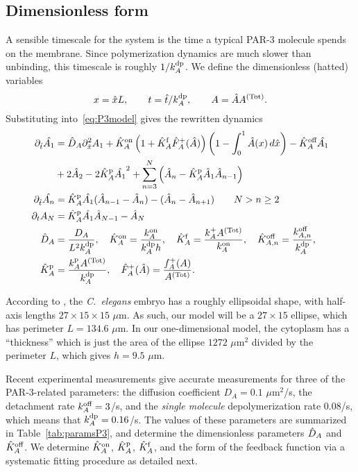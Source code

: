 \documentclass[11pt]{article}
\newcommand{\6}[1]{#1_{\text{6}}}
\newcommand{\3}[1]{#1_{\text{3}}}
\newcommand{\Tot}[1]{#1^\text{(Tot)}}
\newcommand{\A}[1]{#1_A}
\begin{document}
\subsection{Dimensionless form}
A sensible timescale for the system is the time a typical PAR-3 molecule spends on the membrane. Since polymerization dynamics are much slower than unbinding, this timescale is roughly $1/\A{\kdp}$. We define the dimensionless (hatted) variables $$x = \hat{x} L,\qquad t= \hat{t}/\A{\kdp},\qquad A= \hat{A}\Tot{A}.$$
Substituting into\ \eqref{eq:P3model} gives the rewritten dynamics
\begin{subequations}
\label{eq:PAR3gen}
\begin{align}
\nonumber
\Dthat \hat{\MA} & = \DhatA \Dxhat^2 \MA +\KhatonA \left(1+\KhatfA \hat F_A^+(\hat A) \right)\left(1 - \int_0^1 \hat A(x) \, d\hat{x} \right)- \KhatoffA \hat{\MA} \\ 
\label{eq:Amono} &+ 2 \hat{A}_2-2\KhatpA \hat{\MA}^2+\sum_{n=3}^N \left(\hat A_n-\KhatpA \hat A_1 \hat A_{n-1}\right)  \\
\label{eq:Apoly}
\Dthat \hat{\PA} & =\KhatpA \hat{\MA} (\hat A_{n-1}-\hat A_n) - (\hat A_n-\hat A_{n+1})  \qquad N > n \geq 2 \\ 
\Dt A_N & =\KhatpA\hat \MA \hat A_{N-1}- \hat A_N \\ 
\label{eq:paramsND}
\DhatA &=\frac{\A{D}}{L^2 \A{\kdp}}, \quad \KhatonA=\frac{\A{\kon}}{\A{\kdp} h }, \quad \KhatfA = \frac{\A{\kf}\Tot{A}}{\A{\kon}}, \quad  \Khatoff_{A,n} = \frac{\koff_{A,n}}{\A{\kdp}}, \\ \nonumber \KhatpA &= \frac{\A{\kp} \Tot{A}}{\A{\kdp}},\quad \hat F_A^+(\hat A) =\frac{\A{f}^+(A)}{\Tot{A}}.
\end{align}
\end{subequations}

According to \cite{goehring2011polarization}, the \emph{C.\ elegans} embryo has a roughly ellipsoidal shape, with half-axis lengths $27 \times 15 \times 15$ $\mu$m. As such, our model will be a $27 \times 15$ ellipse, which has perimeter $L=134.6$ $\mu$m. In our one-dimensional model, the cytoplasm has a ``thickness'' which is just the area of the ellipse $1272$ $\mu$m$^2$ divided by the perimeter $L$, which gives $h=9.5$ $\mu$m.

Recent experimental measurements \cite{lang2023oligomerization} give accurate measurements for three of the PAR-3-related parameters: the diffusion coefficient $D_A=0.1$ $\mu$m$^2$/s, the detachment rate $k^\text{off}_{A}=3$/s, and the \emph{single molecule} depolymerization rate $0.08$/s, which means that $k^\text{dp}_A=0.16$/s. The values of these parameters are summarized in Table\ \ref{tab:paramsP3}, and determine the dimensionless parameters $\hat{D}_A$ and $\hat{K}^\text{off}_A$. We determine $\hat{K}^\text{on}_A$, $\hat{K}^\text{p}_A$, $\hat{K}^\text{f}_A$, and the form of the feedback function via a systematic fitting procedure as detailed next.
\end{document}

